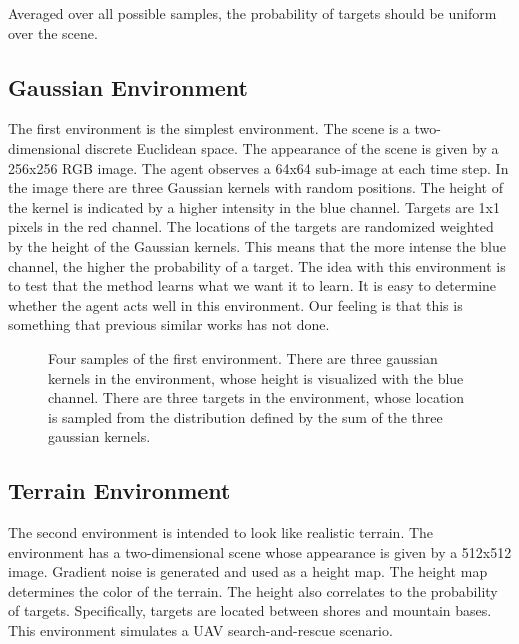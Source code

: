 Averaged over all possible samples, the probability of targets should be uniform over the scene.

\subsection{Gaussian Environment}

The first environment is the simplest environment. 
The scene is a two-dimensional discrete Euclidean space.
The appearance of the scene is given by a 256x256 RGB image.
The agent observes a 64x64 sub-image at each time step.
In the image there are three Gaussian kernels with random positions.
The height of the kernel is indicated by a higher intensity in the blue channel.
Targets are 1x1 pixels in the red channel.
The locations of the targets are randomized weighted by the height of the Gaussian kernels.
This means that the more intense the blue channel, the higher the probability of a target.
The idea with this environment is to test that the method learns what we want it to learn.
It is easy to determine whether the agent acts well in this environment.
Our feeling is that this is something that previous similar works has not done. %

\begin{figure}
    \centering
    
    \label{fig:gaussian}
    \caption[Gaussian environment]{Four samples of the first environment. There are three gaussian kernels in the environment, whose height is visualized with the blue channel. There are three targets in the environment, whose location is sampled from the distribution defined by the sum of the three gaussian kernels.}
\end{figure}

\subsection{Terrain Environment}

The second environment is intended to look like realistic terrain.
The environment has a two-dimensional scene whose appearance is given by a 512x512 image.
Gradient noise is generated and used as a height map.
The height map determines the color of the terrain.
The height also correlates to the probability of targets.
Specifically, targets are located between shores and mountain bases.
This environment simulates a UAV search-and-rescue scenario.

